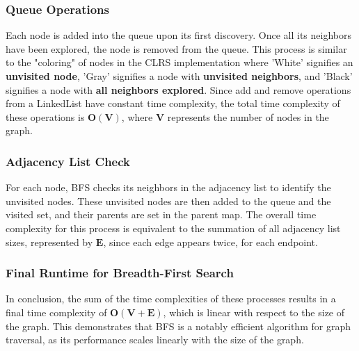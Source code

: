 \subsubsection*{Queue Operations}
Each node is added into the queue upon its first discovery. Once all its neighbors have been explored, the node is removed from the queue. This process is similar to the "coloring" of nodes in the CLRS implementation where 'White' signifies an \textbf{unvisited node}, 'Gray' signifies a node with \textbf{unvisited neighbors}, and 'Black' signifies a node with \textbf{all neighbors explored}. Since add and remove operations from a LinkedList have constant time complexity, the total time complexity of these operations is $\mathbf{O(V)}$, where $\mathbf{V}$ represents the number of nodes in the graph.

\subsubsection*{Adjacency List Check}
For each node, BFS checks its neighbors in the adjacency list to identify the unvisited nodes. These unvisited nodes are then added to the queue and the visited set, and their parents are set in the parent map. The overall time complexity for this process is equivalent to the summation of all adjacency list sizes, represented by $\mathbf{E}$, since each edge appears twice, for each endpoint.

\subsubsection*{Final Runtime for Breadth-First Search}
In conclusion, the sum of the time complexities of these processes results in a final time complexity of $\mathbf{O(V+E)}$, which is linear with respect to the size of the graph. This demonstrates that BFS is a notably efficient algorithm for graph traversal, as its performance scales linearly with the size of the graph.